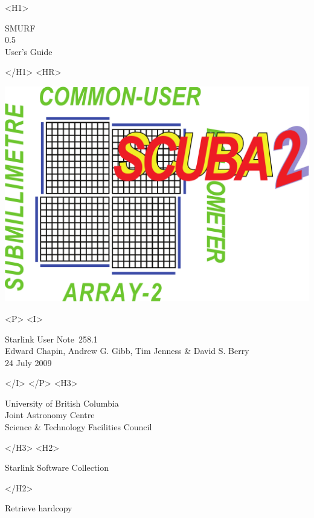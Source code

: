 \documentclass[twoside,11pt]{article}
\newcommand{\stardoccategory}  {Starlink User Note}
\newcommand{\stardocsource}    {sun\stardocnumber}
\newcommand{\stardocnumber}    {258.1}
\newcommand{\stardocauthors}   {Edward Chapin, Andrew G. Gibb, Tim Jenness \& David S. Berry}
\newcommand{\stardocdate}      {24 July 2009}
\newcommand{\stardoctitle}     {SMURF}
\newcommand{\stardocversion}   {0.5}
\newcommand{\stardocmanual}    {User's Guide}
\newcommand{\htmladdnormallink}[2]{#1}
\newcommand{\htmladdimg}[1]{}
\newcommand{\xlabel}[1]{}
\renewcommand{\_}{\texttt{\symbol{95}}}
\begin{document}
\begin{htmlonly}
   \xlabel{}
   \begin{rawhtml} <H1> \end{rawhtml}
      \stardoctitle\\
      \stardocversion\\
      \stardocmanual
   \begin{rawhtml} </H1> <HR> \end{rawhtml}

\includegraphics[scale=0.7]{sun258_logo}

   \begin{rawhtml} <P> <I> \end{rawhtml}
   \stardoccategory\ \stardocnumber \\
   \stardocauthors \\
   \stardocdate
   \begin{rawhtml} </I> </P> <H3> \end{rawhtml}
      \htmladdnormallink{University of British Columbia}
                        {http://www.ubc.ca} \\
      \htmladdnormallink{Joint Astronomy Centre}
                        {http://www.jach.hawaii.edu}\\
      \htmladdnormallink{Science \& Technology Facilities Council}
                        {http://www.pparc.ac.uk} \\
   \begin{rawhtml} </H3> <H2> \end{rawhtml}
      \htmladdnormallink{Starlink Software Collection}{http://starlink.jach.hawaii.edu/}
   \begin{rawhtml} </H2> \end{rawhtml}
   \htmladdnormallink{\htmladdimg{source.gif} Retrieve hardcopy}
      {http://starlink.jach.hawaii.edu/cgi-bin/hcserver?\stardocsource}\\


\end{htmlonly}
\end{document}
